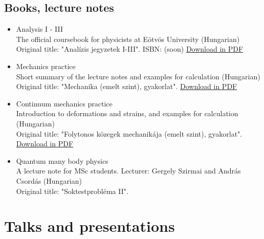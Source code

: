\documentclass[11pt,a4paper,sans]{moderncv}        %
\begin{document}
\subsection{Books, lecture notes}
\begin{itemize}
\item Analysis I - III\\The official coursebook for physicists at Eötvös University (Hungarian)
\\Original title: "Analízis jegyzetek I-III". ISBN: (soon) \href{http://web.cs.elte.hu/~tarcsay/analizis-jegyzetek.pdf}{Download in PDF}

\item Mechanics practice\\
Short summary of the lecture notes and examples for calculation (Hungarian)\\
Original title: "Mechanika (emelt szint), gyakorlat". \href{https://metalog.elte.hu/s/AKqe8ZxjCswPrJE}{Download in PDF}

\item Continuum mechanics practice\\
Introduction to deformations and strains, and examples for calculation (Hungarian)\\
Original title: "Folytonos közegek mechanikája (emelt szint), gyakorlat". \href{https://metalog.elte.hu/s/QcPbMpB6cR6MsNE}{Download in PDF}

\item Quantum many body physics\\
A lecture note for MSc students. Lecturer: Gergely Szirmai and András Csordás (Hungarian)\\
Original title: "Soktestprobléma II".
\end{itemize}

\section{Talks and presentations}

\end{document}
